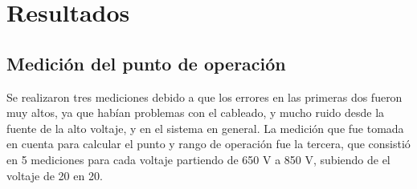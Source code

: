\documentclass[a4paper,10pt]{article}
\numberwithin{equation}{section}
\begin{document}
\section{Resultados}

\subsection{Medición del punto de operación}

Se realizaron tres mediciones debido a que los errores en las primeras dos fueron muy altos, 
ya que habían problemas con el cableado, y mucho ruido desde la fuente de la alto voltaje,
y en el sistema en general. La medición que fue tomada en cuenta para calcular el 
punto y rango de operación fue la tercera, que consistió en 5 mediciones para cada voltaje 
partiendo de 650 V a 850 V, subiendo de el voltaje de 20 en 20. 


\begin{table}[H]
\centering
\caption{Mediciones a distintos voltajes para el flujo de muones}
\end{table}
\end{document}

